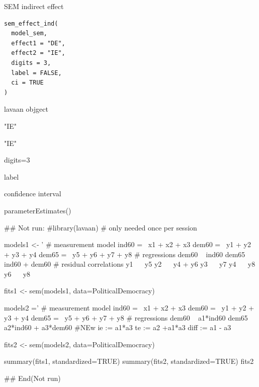 \documentclass[a4paper]{book}
\begin{document}
%
\begin{Description}
SEM indirect effect
\end{Description}
%
\begin{Usage}
\begin{verbatim}
sem_effect_ind(
  model_sem,
  effect1 = "DE",
  effect2 = "IE",
  digits = 3,
  label = FALSE,
  ci = TRUE
)
\end{verbatim}
\end{Usage}
%
\begin{Arguments}
\begin{ldescription}
\item[\code{model\_sem}] lavaan objgect

\item[\code{effect1}] "IE"

\item[\code{effect2}] "IE"

\item[\code{digits}] digits=3

\item[\code{label}] label

\item[\code{ci}] confidence interval
\end{ldescription}
\end{Arguments}
%
\begin{Value}
parameterEstimates()
\end{Value}
%
\begin{Examples}
\begin{ExampleCode}

## Not run: 
#library(lavaan) # only needed once per session

models1 <- '
  # measurement model
    ind60 =~ x1 + x2 + x3
    dem60 =~ y1 + y2 + y3 + y4
    dem65 =~ y5 + y6 + y7 + y8
    # regressions
    dem60 ~ ind60
    dem65 ~ ind60 + dem60
      # residual correlations
    y1 ~~ y5
    y2 ~~ y4 + y6
    y3 ~~ y7
    y4 ~~ y8
    y6 ~~ y8

fits1 <- sem(models1, data=PoliticalDemocracy)


models2 ='
  # measurement model
    ind60 =~ x1 + x2 + x3
    dem60 =~ y1 + y2 + y3 + y4
    dem65 =~ y5 + y6 + y7 + y8
     # regressions
    dem60 ~ a1*ind60
    dem65 ~ a2*ind60 + a3*dem60
 #NEw
   ie := a1*a3
   te := a2 +a1*a3
   diff := a1 - a3

fits2 <- sem(models2, data=PoliticalDemocracy)

summary(fits1, standardized=TRUE)
summary(fits2, standardized=TRUE)
fits2 %

## End(Not run)

\end{ExampleCode}
\end{Examples}
\end{document}

